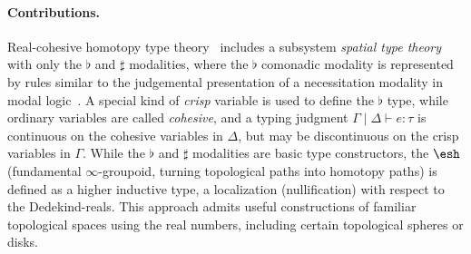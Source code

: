 \documentclass{article}
\begin{document}
  


\paragraph{Contributions.}  Real-cohesive homotopy type
theory~\citet{Shulman2015} includes a subsystem \emph{spatial type
  theory} with only the $\flat$ and $\sharp$ modalities, where the
$\flat$ comonadic modality is represented by rules similar to the
judgemental presentation of a necessitation modality in modal
logic~\citep{Pfenning2001}.  A special kind of \emph{crisp} variable is
used to define the $\flat$ type, while ordinary variables are called
\emph{cohesive}, and a typing judgment $\Gamma \mid \Delta \vdash e :
\tau$ is continuous on the cohesive variables in $\Delta$, but may be
discontinuous on the crisp variables in $\Gamma$.  While the $\flat$ and
$\sharp$ modalities are basic type constructors, the $\shape$
(fundamental $\infty$-groupoid, turning topological paths into homotopy
paths) is defined as a higher inductive type, a localization
(nullification) with respect to the Dedekind-reals.  This approach
admits useful constructions of familiar topological spaces using the
real numbers, including certain topological spheres or disks.
\end{document}
